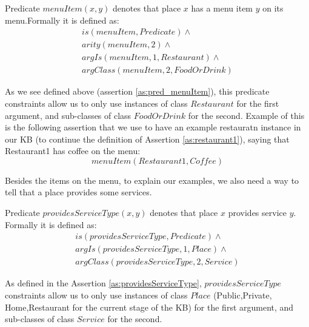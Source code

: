 \begin{definition}\label{def:menuItem}
Predicate $menuItem(x,y)$ denotes that place $x$ has a menu item $y$ on its 
menu.Formally it is defined as:
\begin{equation}\label{as:pred_menuItem}
\begin{gathered}
    is(menuItem,Predicate) \land \\
    arity(menuItem,2) \land \\
	argIs(menuItem,1,Restaurant) \land\\
	argClass(menuItem,2,FoodOrDrink)
\end{gathered}
\end{equation}
\end{definition}
As we see defined above (assertion \ref{as:pred_menuItem}), this predicate
constraints allow us to only use instances of class $Restaurant$ for the first
argument, and sub-classes of class $FoodOrDrink$ for the second. Example of this
is the following assertion that we use to have an example restauratn instance
in our KB (to continue the definition of Assertion \ref{as:restaurant1}), saying
that Restaurant1 has coffee on the menu:
\begin{equation}
menuItem(Restaurant1,Coffee)
\end{equation}

Besides the 
items on the menu, to explain our examples, we also need a way to tell that
a place provides some services.

\begin{definition}\label{def:serviceType}
Predicate $providesServiceType(x,y)$ denotes that place $x$ provides service 
$y$. Formally it is defined as:
\begin{equation}\label{as:providesServiceType}
\begin{gathered}
    is(providesServiceType,Predicate) \land \\
	argIs(providesServiceType,1,Place) \land\\
	argClass(providesServiceType,2, Service)
\end{gathered}
\end{equation}
\end{definition}
As defined in the Assertion \ref{as:providesServiceType}, $providesServiceType$
constraints allow us to only use instances of class $Place$ (Public,Private,
Home,Restaurant for the current stage of the KB) for the first argument, and 
sub-classes of class $Service$ for the second. 

